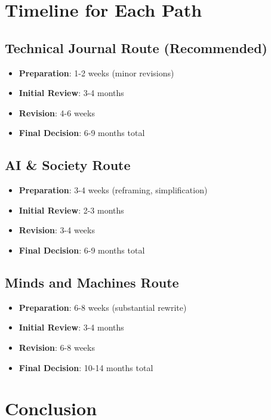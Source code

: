 \documentclass[12pt]{article}
\begin{document}
\section{Timeline for Each Path}

\subsection{Technical Journal Route (Recommended)}

\begin{itemize}[leftmargin=*]
\item \textbf{Preparation}: 1-2 weeks (minor revisions)
\item \textbf{Initial Review}: 3-4 months
\item \textbf{Revision}: 4-6 weeks
\item \textbf{Final Decision}: 6-9 months total
\end{itemize}

\subsection{AI \& Society Route}

\begin{itemize}[leftmargin=*]
\item \textbf{Preparation}: 3-4 weeks (reframing, simplification)
\item \textbf{Initial Review}: 2-3 months
\item \textbf{Revision}: 3-4 weeks
\item \textbf{Final Decision}: 6-9 months total
\end{itemize}

\subsection{Minds and Machines Route}

\begin{itemize}[leftmargin=*]
\item \textbf{Preparation}: 6-8 weeks (substantial rewrite)
\item \textbf{Initial Review}: 3-4 months
\item \textbf{Revision}: 6-8 weeks
\item \textbf{Final Decision}: 10-14 months total
\end{itemize}

\section{Conclusion}
\end{document}
